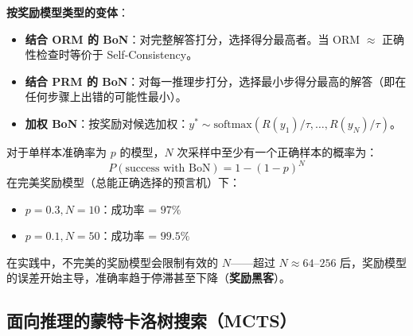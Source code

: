 \textbf{按奖励模型类型的变体}：

\begin{itemize}
  \item \textbf{结合 ORM 的 BoN}：对完整解答打分，选择得分最高者。当 ORM $\approx$ 正确性检查时等价于 Self-Consistency。
  \item \textbf{结合 PRM 的 BoN}：对每一推理步打分，选择最小步得分最高的解答（即在任何步骤上出错的可能性最小）。
  \item \textbf{加权 BoN}：按奖励对候选加权：$y^* \sim \text{softmax}(R(y_1)/\tau, \ldots, R(y_N)/\tau)$。
\end{itemize}

\begin{keybox}[BoN 扩展律]
对于单样本准确率为 $p$ 的模型，$N$ 次采样中至少有一个正确样本的概率为：
\begin{equation}
P(\text{success with BoN}) = 1 - (1-p)^N
\end{equation}
在完美奖励模型（总能正确选择的预言机）下：

\begin{itemize}
  \item $p = 0.3, N = 10$：成功率 = $97\%$
  \item $p = 0.1, N = 50$：成功率 = $99.5\%$
\end{itemize}

在实践中，不完美的奖励模型会限制有效的 $N$——超过 $N \approx 64$--$256$ 后，奖励模型的误差开始主导，准确率趋于停滞甚至下降（\textbf{奖励黑客}）。
\end{keybox}

\subsection{面向推理的蒙特卡洛树搜索（MCTS）}
\label{monte-carlo-tree-search-mcts-for-reasoning}

